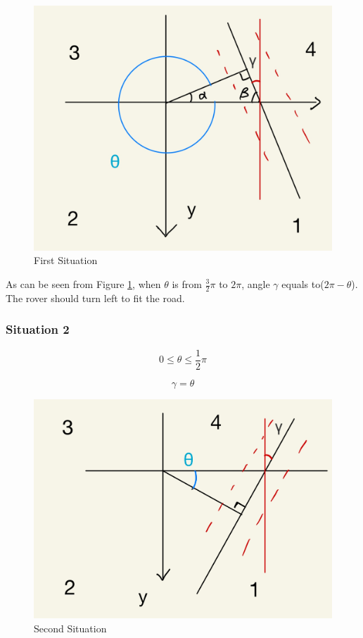 \documentclass[12pt, a4paper, oneside]{report}
\begin{document}
\begin{figure}[H]
    \centering
    \includegraphics[scale=0.14]{pic/angle/1.png}
    \caption{First Situation}
    \label{firs}
\end{figure}
As can be seen from Figure \ref{firs}, when $\theta$ is from $\frac{3}{2}\pi$ to $2\pi$, angle $\gamma$ equals to($2\pi-\theta$). The rover should turn left to fit the road.

\subsubsection{Situation 2}
\begin{tcolorbox}
    $$0\leq\theta\leq\frac{1}{2}\pi$$
    
    $$\gamma=\theta$$
\end{tcolorbox}

\begin{figure}[H]
    \centering
    \includegraphics[scale=0.14]{pic/angle/2.png}
    \caption{Second Situation}
    \label{secs}
\end{figure}
\end{document}
